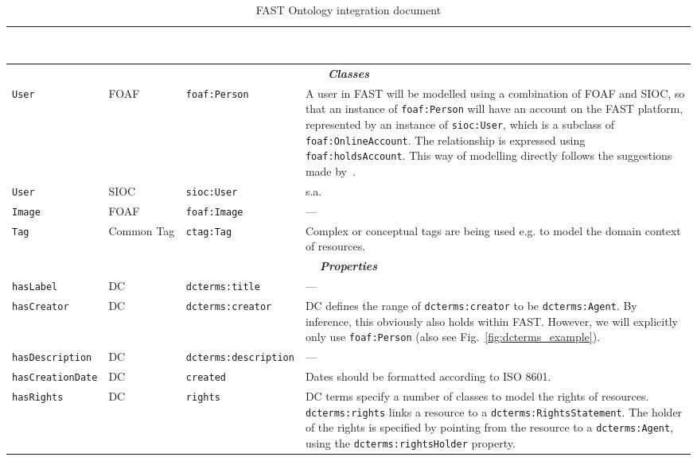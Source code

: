 \documentclass{fast_latex}
\begin{document}
\singlespacing
\begin{small}
\begin{longtable}{|p{2.6cm}|p{1.5cm}|p{3cm}|p{7cm}|}
\caption{\label{tab:integration_document}FAST Ontology integration document}\\
\hline
\rowcolor{fast@lightgrey}\textcolor{white}{\textbf{FAST Term}} & 
\textcolor{white}{\textbf{Integrated Ontology}} & 
\textcolor{white}{\textbf{Integrated Term}} & 
\textcolor{white}{\textbf{Comment}} \\ \hline
\endfirsthead
\multicolumn{4}{|c|}{\emph{\textbf{Classes}}} \\ \hline
\texttt{User} & FOAF & \texttt{foaf:Person} & A user in FAST will be modelled using a combination of FOAF and SIOC, so that an instance of \texttt{foaf:Person} will have an account on the FAST platform, represented by an instance of \texttt{sioc:User}, which is a subclass of \texttt{foaf:OnlineAccount}. The relationship is expressed using \texttt{foaf:holdsAccount}. This way of modelling directly follows the suggestions made by~\cite{sioc_related2007}.\\ \hline
\texttt{User} & SIOC & \texttt{sioc:User} & s.a.\\ \hline
\texttt{Image} & FOAF & \texttt{foaf:Image} & --- \\ \hline
\texttt{Tag} & Common Tag & \texttt{ctag:Tag} & Complex or conceptual tags are being used e.g. to model the domain context of resources.	 \\ \hline
\multicolumn{4}{|c|}{\emph{\textbf{Properties}}} \\ \hline
\texttt{hasLabel} & DC & \texttt{dcterms:title} & ---  \\ \hline
\texttt{hasCreator} & DC & \texttt{dcterms:creator} & DC defines the range of \texttt{dcterms:creator} to be \texttt{dcterms:Agent}. By inference, this obviously also holds within FAST. However, we will explicitly only use \texttt{foaf:Person} (also see Fig.~\ref{fig:dcterms_example}). \\ \hline
\texttt{hasDescription} & DC & \texttt{dcterms:description} & --- \\ \hline
\texttt{hasCreationDate} & DC & \texttt{created} & Dates should be formatted according to ISO 8601. \\ \hline
\texttt{hasRights} & DC & \texttt{rights} & DC terms specify a number of classes to model the rights of resources. \texttt{dcterms:rights} links a resource to a \texttt{dcterms:RightsStatement}. The holder of the rights is specified by pointing from the resource to a \texttt{dcterms:Agent}, using the \texttt{dcterms:rightsHolder} property. \\ \hline

\end{longtable}
\end{small}
\end{document}
